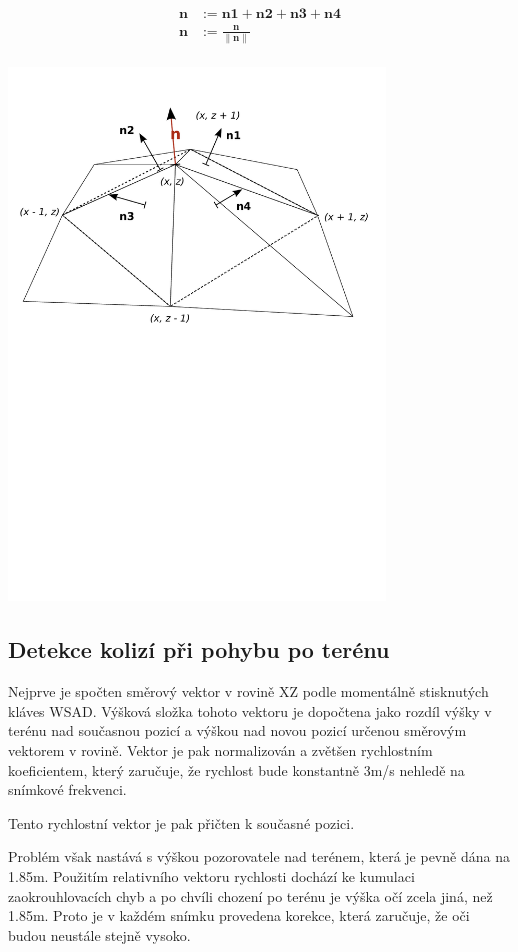 \documentclass[11pt]{article}
\begin{document}
\begin{align*}
\mathbf n &:= \mathbf {n1} + \mathbf {n2} + \mathbf {n3} + \mathbf {n4} \\
\mathbf n &:= \frac{\mathbf n}{\|\mathbf n\|} \\
\end{align*}

\begin{center}
\includegraphics[width=10cm]{normals_persp.pdf}
\end{center}

\subsection{Detekce kolizí při pohybu po terénu}
Nejprve je spočten směrový vektor v rovině XZ podle momentálně stisknutých
kláves WSAD. Výšková složka tohoto vektoru je dopočtena jako rozdíl výšky v
terénu nad současnou pozicí a výškou nad novou pozicí určenou směrovým vektorem
v rovině. Vektor je pak normalizován a zvětšen rychlostním koeficientem, který
zaručuje, že rychlost bude konstantně 3m/s nehledě na snímkové frekvenci.

Tento rychlostní vektor je pak přičten k současné pozici.

Problém však nastává s výškou pozorovatele nad terénem, která je pevně dána na
1.85m. Použitím relativního vektoru rychlosti dochází ke kumulaci
zaokrouhlovacích chyb a po chvíli chození po terénu je výška očí zcela jiná,
než 1.85m. Proto je v každém snímku provedena korekce, která zaručuje, že oči
budou neustále stejně vysoko.
\end{document}
